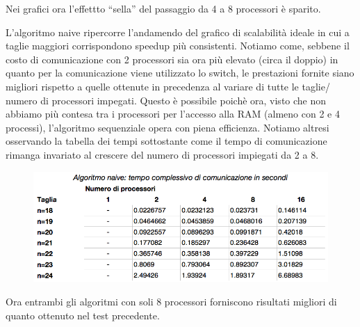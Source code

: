 \documentclass[12pt,a4paper,oneside,openright]{article}
\begin{document}
Nei grafici ora l'effettto ``sella'' del passaggio da 4 a 8 processori è sparito. 

L'algoritmo naive ripercorre l'andamendo del grafico di scalabilità ideale in cui a taglie maggiori corrispondono speedup più consistenti.
Notiamo come, sebbene il costo di comunicazione con 2 processori sia ora più elevato (circa il doppio) in quanto per la comunicazione viene utilizzato lo switch, le prestazioni fornite siano migliori rispetto a quelle ottenute in precedenza al variare di tutte le taglie/ numero di processori impegati.
Questo è possibile poichè ora, visto che non abbiamo più contesa tra i processori per l'accesso alla RAM (almeno con 2 e 4 processi), l'algoritmo sequenziale opera con piena efficienza.
Notiamo altresi osservando la tabella dei tempi sottostante come il tempo di comunicazione rimanga invariato al crescere del numero di processori impiegati da 2 a 8.
\begin{figure}[H] 
  \centering
      \includegraphics[width=\textwidth]{immagini/algoritmo_normale_tempo_comunicazione_con_rete}
\end{figure}

Ora entrambi gli algoritmi con soli 8 processori forniscono risultati migliori di quanto ottenuto nel test precedente.
\end{document}
